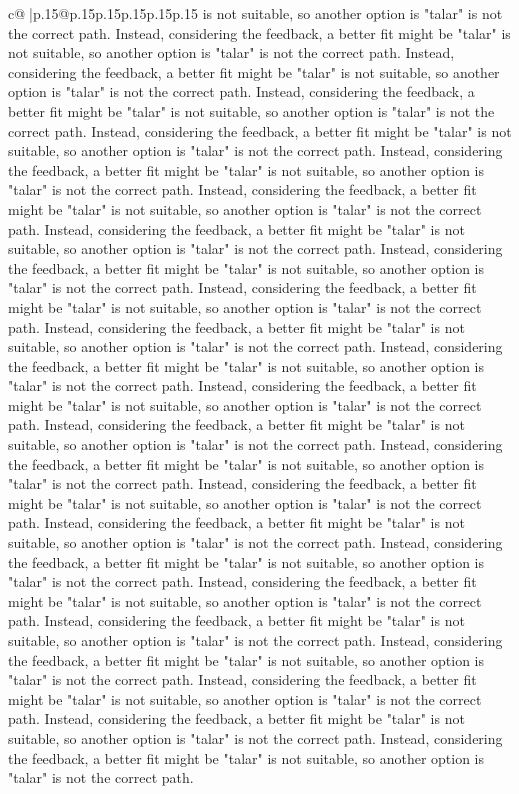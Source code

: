 \documentclass{article}
\begin{document}
{\begin{supertabular}{c@{$\;$}|p{.15\linewidth}@{}p{.15\linewidth}p{.15\linewidth}p{.15\linewidth}p{.15\linewidth}p{.15\linewidth}}
{{{is not suitable, so another option is "talar" is not the correct path. Instead, considering the feedback, a better fit might be "talar" is not suitable, so another option is "talar" is not the correct path. Instead, considering the feedback, a better fit might be "talar" is not suitable, so another option is "talar" is not the correct path. Instead, considering the feedback, a better fit might be "talar" is not suitable, so another option is "talar" is not the correct path. Instead, considering the feedback, a better fit might be "talar" is not suitable, so another option is "talar" is not the correct path. Instead, considering the feedback, a better fit might be "talar" is not suitable, so another option is "talar" is not the correct path. Instead, considering the feedback, a better fit might be "talar" is not suitable, so another option is "talar" is not the correct path. Instead, considering the feedback, a better fit might be "talar" is not suitable, so another option is "talar" is not the correct path. Instead, considering the feedback, a better fit might be "talar" is not suitable, so another option is "talar" is not the correct path. Instead, considering the feedback, a better fit might be "talar" is not suitable, so another option is "talar" is not the correct path. Instead, considering the feedback, a better fit might be "talar" is not suitable, so another option is "talar" is not the correct path. Instead, considering the feedback, a better fit might be "talar" is not suitable, so another option is "talar" is not the correct path. Instead, considering the feedback, a better fit might be "talar" is not suitable, so another option is "talar" is not the correct path. Instead, considering the feedback, a better fit might be "talar" is not suitable, so another option is "talar" is not the correct path. Instead, considering the feedback, a better fit might be "talar" is not suitable, so another option is "talar" is not the correct path. Instead, considering the feedback, a better fit might be "talar" is not suitable, so another option is "talar" is not the correct path. Instead, considering the feedback, a better fit might be "talar" is not suitable, so another option is "talar" is not the correct path. Instead, considering the feedback, a better fit might be "talar" is not suitable, so another option is "talar" is not the correct path. Instead, considering the feedback, a better fit might be "talar" is not suitable, so another option is "talar" is not the correct path. Instead, considering the feedback, a better fit might be "talar" is not suitable, so another option is "talar" is not the correct path. Instead, considering the feedback, a better fit might be "talar" is not suitable, so another option is "talar" is not the correct path. Instead, considering the feedback, a better fit might be "talar" is not suitable, so another option is "talar" is not the correct path. Instead, considering the feedback, a better fit might be "talar" is not suitable, so another option is "talar" is not the correct path. Instead, considering the feedback, a better fit might be "talar" is not suitable, so another option is "talar" is not the correct path. }}}
\end{supertabular}}
\end{document}
